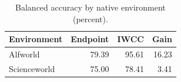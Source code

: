\begin{table}[t]
\centering
\caption{Balanced accuracy by native environment (percent).}
\label{tab:environment}
\begin{tabular}{lrrr}
\toprule
Environment & Endpoint & IWCC & Gain \\
\midrule
Alfworld & 79.39 & 95.61 & 16.23 \\
Scienceworld & 75.00 & 78.41 & 3.41 \\
\bottomrule
\end{tabular}
\end{table}
